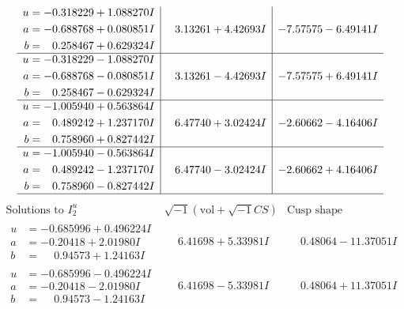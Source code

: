\documentclass[1p]{elsarticle_modified}
\theoremstyle{definition}
\newcommand{\I}{\sqrt{-1}}
\begin{document}
$$\begin{array}{c|c|c}
\begin{aligned}
u &= -0.318229 + 1.088270 I \\
a &= -0.688768 + 0.080851 I \\
b &= \phantom{-}0.258467 + 0.629324 I\end{aligned}
 & \phantom{-}3.13261 + 4.42693 I & -7.57575 - 6.49141 I \\ \hline\begin{aligned}
u &= -0.318229 - 1.088270 I \\
a &= -0.688768 - 0.080851 I \\
b &= \phantom{-}0.258467 - 0.629324 I\end{aligned}
 & \phantom{-}3.13261 - 4.42693 I & -7.57575 + 6.49141 I \\ \hline\begin{aligned}
u &= -1.005940 + 0.563864 I \\
a &= \phantom{-}0.489242 + 1.237170 I \\
b &= \phantom{-}0.758960 + 0.827442 I\end{aligned}
 & \phantom{-}6.47740 + 3.02424 I & -2.60662 - 4.16406 I \\ \hline\begin{aligned}
u &= -1.005940 - 0.563864 I \\
a &= \phantom{-}0.489242 - 1.237170 I \\
b &= \phantom{-}0.758960 - 0.827442 I\end{aligned}
 & \phantom{-}6.47740 - 3.02424 I & -2.60662 + 4.16406 I\\
 \hline 
 \end{array}$$\newpage$$\begin{array}{c|c|c}  
\text{Solutions to }I^u_{2}& \I (\text{vol} + \sqrt{-1}CS) & \text{Cusp shape}\\
 \hline 
\begin{aligned}
u &= -0.685996 + 0.496224 I \\
a &= -0.20418 + 2.01980 I \\
b &= \phantom{-}0.94573 + 1.24163 I\end{aligned}
 & \phantom{-}6.41698 + 5.33981 I & \phantom{-}0.48064 - 11.37051 I \\ \hline\begin{aligned}
u &= -0.685996 - 0.496224 I \\
a &= -0.20418 - 2.01980 I \\
b &= \phantom{-}0.94573 - 1.24163 I\end{aligned}
 & \phantom{-}6.41698 - 5.33981 I & \phantom{-}0.48064 + 11.37051 I \\ \hline\begin{aligned}

\end{aligned}
\end{array}$$
\end{document}
